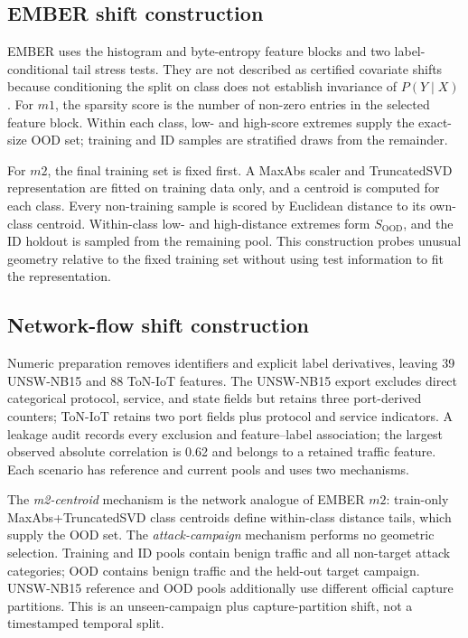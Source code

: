 \documentclass[referee,lineno,pdflatex,sn-nature]{sn-jnl}
\theoremstyle{thmstyleone}%
\theoremstyle{thmstyletwo}%
\theoremstyle{thmstylethree}%
\begin{document}
\subsection{EMBER shift construction}

EMBER uses the histogram and byte-entropy feature blocks and two label-conditional tail stress tests. They are not described as certified covariate shifts because conditioning the split on class does not establish invariance of $P(Y\mid X)$. For $m1$, the sparsity score is the number of non-zero entries in the selected feature block. Within each class, low- and high-score extremes supply the exact-size OOD set; training and ID samples are stratified draws from the remainder.

For $m2$, the final training set is fixed first. A MaxAbs scaler and TruncatedSVD representation are fitted on training data only, and a centroid is computed for each class. Every non-training sample is scored by Euclidean distance to its own-class centroid. Within-class low- and high-distance extremes form $S_{\mathrm{OOD}}$, and the ID holdout is sampled from the remaining pool. This construction probes unusual geometry relative to the fixed training set without using test information to fit the representation.

\subsection{Network-flow shift construction}

Numeric preparation removes identifiers and explicit label derivatives, leaving 39 UNSW-NB15 and 88 ToN-IoT features. The UNSW-NB15 export excludes direct categorical protocol, service, and state fields but retains three port-derived counters; ToN-IoT retains two port fields plus protocol and service indicators. A leakage audit records every exclusion and feature--label association; the largest observed absolute correlation is 0.62 and belongs to a retained traffic feature. Each scenario has reference and current pools and uses two mechanisms.

The \emph{m2-centroid} mechanism is the network analogue of EMBER $m2$: train-only MaxAbs+TruncatedSVD class centroids define within-class distance tails, which supply the OOD set. The \emph{attack-campaign} mechanism performs no geometric selection. Training and ID pools contain benign traffic and all non-target attack categories; OOD contains benign traffic and the held-out target campaign. UNSW-NB15 reference and OOD pools additionally use different official capture partitions. This is an unseen-campaign plus capture-partition shift, not a timestamped temporal split.
\end{document}
